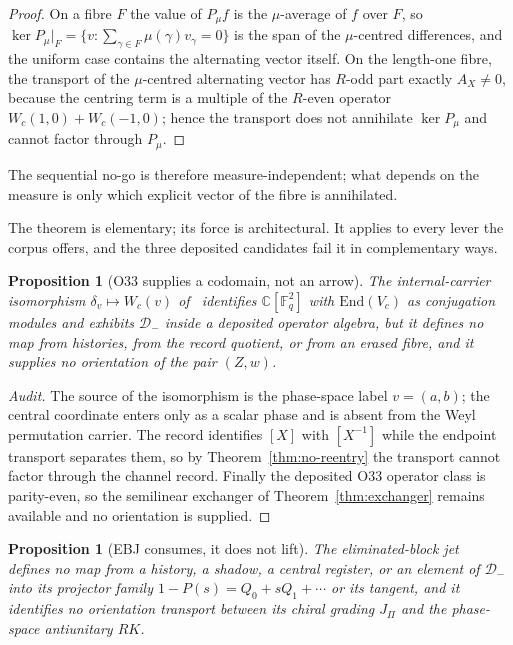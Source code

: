 \documentclass[11pt,a4paper]{article}
\newtheorem{proposition}[theorem]{Proposition}
\theoremstyle{definition}
\theoremstyle{remark}
\newcommand{\C}{\mathbb{C}}
\newcommand{\Fq}{\mathbb{F}_q}
\newcommand{\End}{\mathrm{End}}
\newcommand{\Dminus}{\mathcal{D}_{-}}
\newcommand{\Vc}{V_{c}}
\newcommand{\AX}{A_{X}}
\begin{document}
\begin{proof}
  On a fibre $F$ the value of $P_\mu f$ is the $\mu$-average of $f$ over $F$, so
  $\ker P_\mu|_{F}=\{v:\sum_{\gamma\in F}\mu(\gamma)v_\gamma=0\}$ is the span of the
  $\mu$-centred differences, and the uniform case contains the alternating vector
  itself.
  On the length-one fibre, the transport of the $\mu$-centred alternating vector has
  $R$-odd part exactly $\AX\neq0$, because the centring term is a multiple of the
  $R$-even operator $W_c(1,0)+W_c(-1,0)$; hence the transport does not annihilate
  $\ker P_\mu$ and cannot factor through $P_\mu$.
\end{proof}

The sequential no-go is therefore measure-independent; what depends on the measure is
only which explicit vector of the fibre is annihilated.

The theorem is elementary; its force is architectural.
It applies to every lever the corpus offers, and the three deposited candidates fail it
in complementary ways.

\begin{proposition}[O33 supplies a codomain, not an arrow]
  \label{prop:o33-lever}
  The internal-carrier isomorphism $\delta_v\mapsto W_c(v)$ of~\cite{Beau2026a37}
  identifies $\C[\Fq^2]$ with $\End(\Vc)$ as conjugation modules and exhibits
  $\Dminus$ inside a deposited operator algebra, but it defines no map from histories,
  from the record quotient, or from an erased fibre, and it supplies no orientation of
  the pair $(Z,w)$.
\end{proposition}

\begin{proof}[Audit]
  The source of the isomorphism is the phase-space label $v=(a,b)$; the central
  coordinate enters only as a scalar phase and is absent from the Weyl permutation
  carrier.
  The record identifies $[X]$ with $[X^{-1}]$ while the endpoint transport separates
  them, so by Theorem~\ref{thm:no-reentry} the transport cannot factor through the
  channel record.
  Finally the deposited O33 operator class is parity-even, so the semilinear exchanger
  of Theorem~\ref{thm:exchanger} remains available and no orientation is supplied.
\end{proof}

\begin{proposition}[EBJ consumes, it does not lift]
  \label{prop:ebj-lever}
  The eliminated-block jet~\cite{Beau2026ebj} defines no map from a history, a shadow, a
  central register, or an element of $\Dminus$ into its projector family
  $1-P(s)=Q_0+sQ_1+\cdots$ or its tangent, and it identifies no orientation transport
  between its chiral grading $J_\Pi$ and the phase-space antiunitary $RK$.
\end{proposition}
\end{document}

